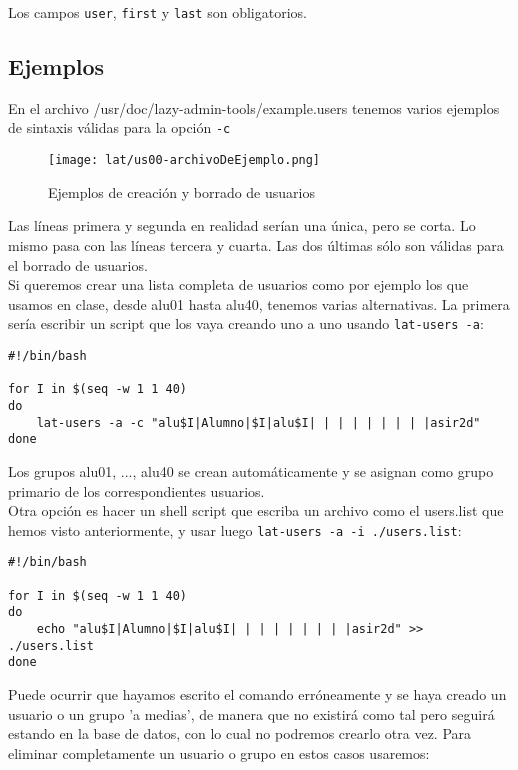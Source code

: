 Los campos \lstinline!user!, \lstinline!first! y \lstinline!last! son obligatorios.

\subsection{Ejemplos}
En el archivo /usr/doc/lazy-admin-tools/example.users tenemos varios ejemplos de sintaxis válidas para la opción \lstinline!-c!
\begin{figure}[H]
    \centering
    \texttt{[image: lat/us00-archivoDeEjemplo.png]}
    \caption{Ejemplos de creación y borrado de usuarios}
\end{figure}

Las líneas primera y segunda en realidad serían una única, pero se corta. Lo mismo pasa con las líneas tercera y cuarta. Las dos últimas sólo son válidas para el borrado de usuarios.\\

Si queremos crear una lista completa de usuarios como por ejemplo los que usamos en clase, desde alu01 hasta alu40, tenemos varias alternativas. La primera sería escribir un script que los vaya creando uno a uno usando \lstinline!lat-users -a!:

\begin{lstlisting}
#!/bin/bash

for I in $(seq -w 1 1 40)
do
    lat-users -a -c "alu$I|Alumno|$I|alu$I| | | | | | | | |asir2d"
done
\end{lstlisting}

Los grupos alu01, ..., alu40 se crean automáticamente y se asignan como grupo primario de los correspondientes usuarios.\\

Otra opción es hacer un shell script que escriba un archivo como el users.list que hemos visto anteriormente, y usar luego \lstinline!lat-users -a -i ./users.list!:

\begin{lstlisting}
#!/bin/bash

for I in $(seq -w 1 1 40)
do
    echo "alu$I|Alumno|$I|alu$I| | | | | | | | |asir2d" >> ./users.list  
done
\end{lstlisting}

Puede ocurrir que hayamos escrito el comando erróneamente y se haya creado un usuario o un grupo 'a medias', de manera que no existirá como tal pero seguirá estando en la base de datos, con lo cual no podremos crearlo otra vez. Para eliminar completamente un usuario o grupo en estos casos usaremos:

